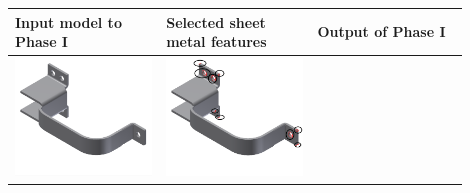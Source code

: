 \begin{minipage}[t]{\linewidth}
\begin{tabular}[h]{@{} p{0.3\linewidth} p{0.3\linewidth}  p{0.3\linewidth}@{}} \toprule

\textbf{Input model to Phase I} & \textbf{Selected sheet metal features} & \textbf{Output of Phase I} \\ \midrule

\includegraphics[width=0.98\linewidth]{..//Common/images/DefeatBracketPhase_I_1} &
\includegraphics[width=0.98\linewidth]{..//Common/images/DefeatBracketPhase_I_2_circled} &

\end{tabular}
\end{minipage}
